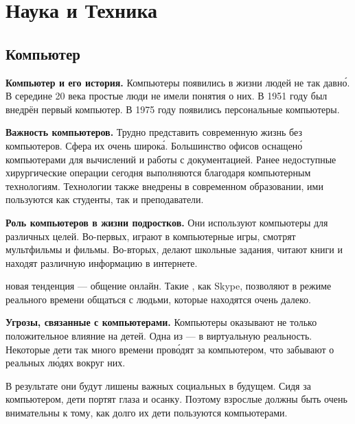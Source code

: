 \chapter{Наука и Техника}


\section{Компьютер}
\textbf{Компьютер и его история.} Компьютеры появились в жизни людей не так давн\'{о}. В середине 20 века простые люди не имели понятия о них. В 1951 году был внедрён первый  компьютер. В 1975 году появились персональные компьютеры.

\textbf{Важность компьютеров.} Трудно представить современную жизнь без компьютеров. Сфера их  очень широк\'{а}.
Большинство офисов оснащен\'{о} компьютерами для вычислений и работы с документацией. Ранее недоступные хирургические операции сегодня выполняются благодаря компьютерным технологиям. Технологии также внедрены в современном образовании, ими пользуются как студенты, так и преподаватели.

\textbf{Роль компьютеров в жизни подростков.}
Они используют компьютеры для различных целей. Во-первых, играют в компьютерные игры, смотрят мультфильмы и фильмы. Во-вторых, делают школьные задания, читают книги и находят различную информацию в интернете.

 новая тенденция --- общение онлайн. Такие , как Skype, позволяют в режиме реального времени общаться с людьми, которые находятся очень далеко.

\textbf{Угрозы, связанные с компьютерами.}
Компьютеры оказывают не только положительное влияние на детей. Одна из  ---  в виртуальную реальность. Некоторые дети так много времени пров\'{о}дят за компьютером, что забывают о реальных л\'{ю}дях вокруг них.

В результате они будут лишены важных социальных  в будущем. Сидя за компьютером, дети портят глаза и осанку. Поэтому взрослые должны быть очень внимательны к тому, как долго их дети пользуются компьютерами.




